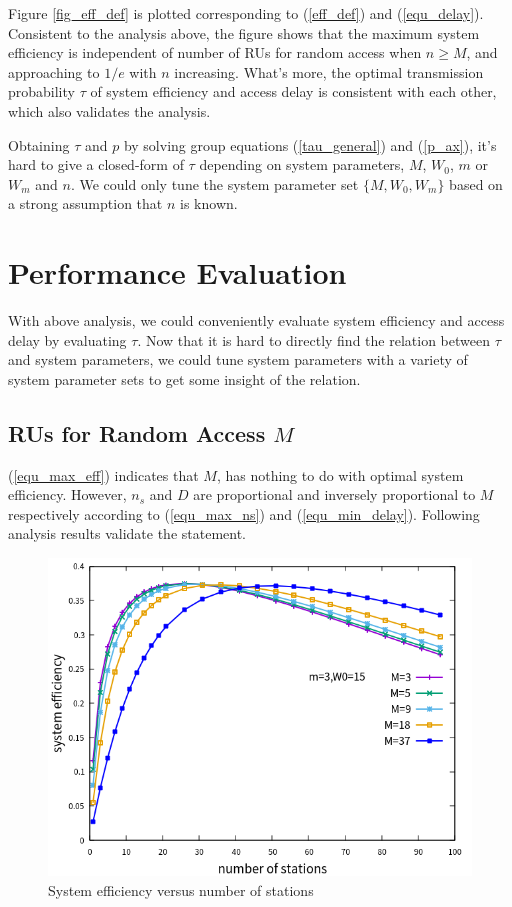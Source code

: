 \documentclass[journal]{IEEEtran}
\begin{document}
Figure \ref{fig_eff_def} is plotted corresponding to (\ref{eff_def}) and (\ref{equ_delay}).
Consistent to the analysis above, the figure shows that the maximum system efficiency is independent of number of RUs for random access when $n\geq M$, and approaching to $1/e$ with $n$ increasing. 
What's more, the optimal transmission probability $\tau$ of system efficiency and access delay is consistent with each other, which also validates the analysis. 

Obtaining $\tau$ and $p$ by solving group equations (\ref{tau_general}) and (\ref{p_ax}), it's hard to give a closed-form of $\tau$ depending on system parameters, $M$, $W_0$, $m$ or $W_m$ and $n$.
We could only tune the system parameter set $\lbrace M, W_0, W_m \rbrace$ based on a strong assumption that $n$ is known.

\section{Performance Evaluation} 	\label{sec_perf_eval}
With above analysis, we could conveniently evaluate system efficiency and access delay by evaluating $\tau$.
Now that it is hard to directly find the relation between $\tau$ and system parameters, we could tune system parameters with a variety of system parameter sets to get some insight of the relation.


\subsection{RUs for Random Access $M$}
\label{M}
(\ref{equ_max_eff}) indicates that $M$, has nothing to do with optimal system efficiency. 
However, $n_s$ and $D$ are proportional and inversely proportional to $M$ respectively according to (\ref{equ_max_ns}) and (\ref{equ_min_delay}). 
Following analysis results validate the statement.


\begin{figure}[!t]
\centering
\includegraphics[scale=.54]{./figure/n_M_eff_perf.png}
\caption{System efficiency versus number of stations}
\label{fig_n_M_eff}
\end{figure}
\end{document}
